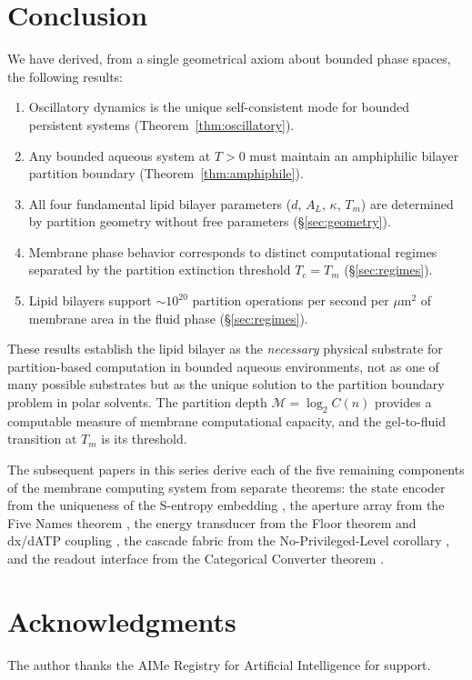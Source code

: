 \documentclass[11pt,twocolumn,a4paper]{article}
\theoremstyle{definition}
\theoremstyle{remark}
\newcommand{\Mpart}{\mathcal{M}}
\begin{document}
\section{Conclusion}
\label{sec:conclusion}

We have derived, from a single geometrical axiom about bounded phase spaces,
the following results:
\begin{enumerate}[nosep]
  \item Oscillatory dynamics is the unique self-consistent mode for bounded
    persistent systems (Theorem~\ref{thm:oscillatory}).
  \item Any bounded aqueous system at $T > 0$ must maintain an amphiphilic
    bilayer partition boundary (Theorem~\ref{thm:amphiphile}).
  \item All four fundamental lipid bilayer parameters ($d$, $A_L$, $\kappa$,
    $T_m$) are determined by partition geometry without free parameters
    (\S\ref{sec:geometry}).
  \item Membrane phase behavior corresponds to distinct computational regimes
    separated by the partition extinction threshold $T_c = T_m$
    (\S\ref{sec:regimes}).
  \item Lipid bilayers support ${\sim}10^{20}$ partition operations per
    second per $\mu\text{m}^2$ of membrane area in the fluid phase
    (\S\ref{sec:regimes}).
\end{enumerate}

These results establish the lipid bilayer as the \emph{necessary} physical
substrate for partition-based computation in bounded aqueous environments,
not as one of many possible substrates but as the unique solution to the
partition boundary problem in polar solvents. The partition depth
$\Mpart = \log_2 C(n)$ provides a computable measure of membrane computational
capacity, and the gel-to-fluid transition at $T_m$ is its threshold.

The subsequent papers in this series derive each of the five remaining
components of the membrane computing system from separate theorems:
the state encoder from the uniqueness of the S-entropy embedding
\citep{companion2}, the aperture array from the Five Names theorem
\citep{companion3}, the energy transducer from the Floor theorem and
dx/dATP coupling \citep{companion4}, the cascade fabric from the
No-Privileged-Level corollary \citep{companion5}, and the readout interface
from the Categorical Converter theorem \citep{companion6}.

\section*{Acknowledgments}

The author thanks the AIMe Registry for Artificial Intelligence for support.



\end{document}
